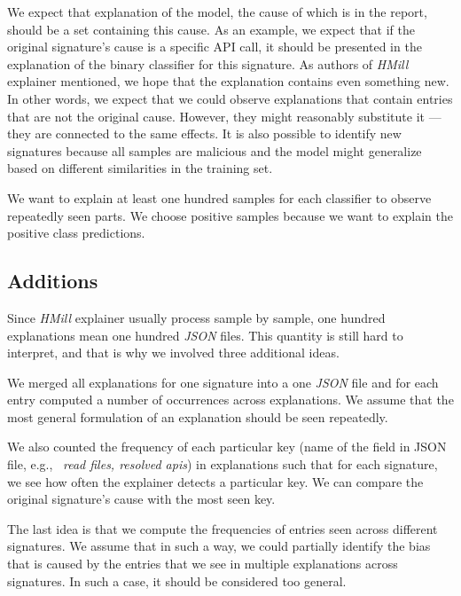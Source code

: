 We expect that explanation of the model, the cause of which is in the report, should be a set containing this cause. As an example, we expect that if the original signature's cause is a specific API call, it should be presented in the explanation of the binary classifier for this signature. As authors of \emph{HMill} explainer mentioned, we hope that the explanation contains even something new. In other words, we expect that we could observe explanations that contain entries that are not the original cause. However, they might reasonably substitute it --- they are connected to the same effects. It is also possible to identify new signatures because all samples are malicious and the model might generalize based on different similarities in the training set.

We want to explain at least one hundred samples for each classifier to observe repeatedly seen parts. We choose positive samples because we want to explain the positive class predictions.

\subsection{Additions}
Since \emph{HMill} explainer usually process sample by sample, one hundred explanations mean one hundred \emph{JSON} files. This quantity is still hard to interpret, and that is why we involved three additional ideas.

We merged all explanations for one signature into a one \emph{JSON} file and for each entry computed a number of occurrences across explanations. We assume that the most general formulation of an explanation should be seen repeatedly. 

We also counted the frequency of each particular key (name of the field in JSON file, e.g., \ \emph{read files, resolved apis}) in explanations such that for each signature, we see how often the explainer detects a particular key. We can compare the original signature's cause with the most seen key.

The last idea is that we compute the frequencies of entries seen across different signatures. We assume that in such a way, we could partially identify the bias that is caused by the entries that we see in multiple explanations across signatures. In such a case, it should be considered too general.